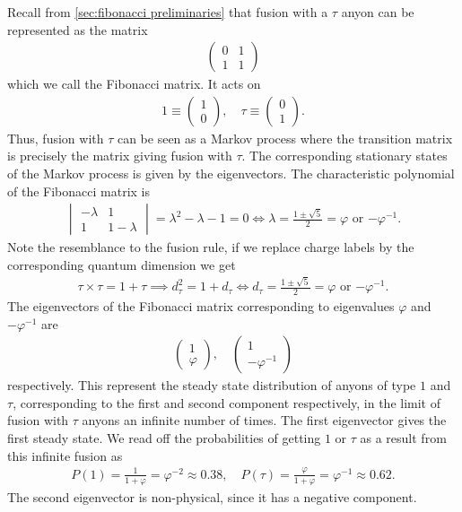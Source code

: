 Recall from \cref{sec:fibonacci preliminaries} that fusion with a $\tau$ anyon can be represented as the matrix
\begin{align}
  \begin{pmatrix}
    0 & 1 \\
    1 & 1
  \end{pmatrix}
\end{align}
which we call the Fibonacci matrix. It acts on
\begin{align}
  1 \equiv \begin{pmatrix} 1 \\ 0 \end{pmatrix}, \quad \tau \equiv \begin{pmatrix} 0 \\ 1 \end{pmatrix}.
\end{align}
Thus, fusion with $τ$ can be seen as a Markov process where the transition matrix is precisely the matrix giving fusion with $τ$. The corresponding stationary states of the Markov process is given by the eigenvectors. The characteristic polynomial of the Fibonacci matrix is
\begin{align}
  \begin{vmatrix}
    -λ & 1 \\
    1 & 1-λ
  \end{vmatrix} =
  λ^2-λ-1 = 0 \iff \lambda = \frac{1±\sqrt{5}}{2} = φ \text{ or } {-φ^{-1}}.
\end{align}
Note the resemblance to the fusion rule, if we replace charge labels by the corresponding quantum dimension we get
\begin{align}
  τ × τ = 1 + τ \implies d_τ^2 = 1 + d_τ \iff d_τ = \frac{1±\sqrt{5}}{2} = φ \text{ or } {-φ^{-1}}.
\end{align}
The eigenvectors of the Fibonacci matrix corresponding to eigenvalues $φ$ and $-φ^{-1}$ are
\begin{align}
  \begin{pmatrix}
    1 \\ φ
  \end{pmatrix}, \quad
  \begin{pmatrix}
    1 \\ -φ^{-1}
  \end{pmatrix}
\end{align}
respectively. This represent the steady state distribution of anyons of type $1$ and $τ$, corresponding to the first and second component respectively, in the limit of fusion with $\tau$ anyons an infinite number of times. The first eigenvector gives the first steady state. We read off the probabilities of getting $1$ or $\tau$ as a result from this infinite fusion as
\begin{align}
  P(1) = \frac{1}{1+φ} = φ^{-2} ≈ 0.38, \quad
  P(τ) = \frac{φ}{1+φ} = φ^{-1} ≈ 0.62.
\end{align}
The second eigenvector is non-physical, since it has a negative component.

